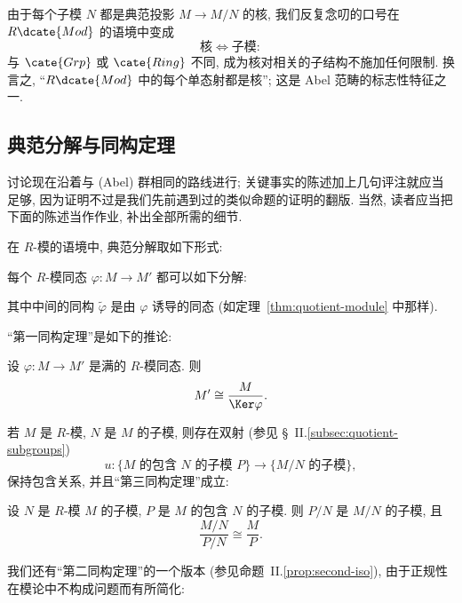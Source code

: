 由于每个子模 $N$ 都是典范投影 $M \rightarrow M/N$ 的核, 我们反复念叨的口号在 $R\dcate{Mod}$ 的语境中变成
\[
\text{核} \iff \text{子模}:
\]
与 $\cate{Grp}$ 或 $\cate{Ring}$ 不同, 成为核对相关的子结构不施加任何限制. 换言之, ``$R\dcate{Mod}$ 中的每个单态射都是核''; 这是 Abel 范畴的标志性特征之一.

\subsection{典范分解与同构定理}
\label{subsec:module-canonical}

讨论现在沿着与 (Abel) 群相同的路线进行; 关键事实的陈述加上几句评注就应当足够, 因为证明不过是我们先前遇到过的类似命题的证明的翻版. 当然, 读者应当把下面的陈述当作作业, 补出全部所需的细节.

在 $R$-模的语境中, 典范分解取如下形式:

\begin{theorem}
\label{thm:module-canonical}
每个 $R$-模同态 $\varphi : M \to M'$ 都可以如下分解:
\begin{center}
\end{center}
其中中间的同构 $\tilde{\varphi}$ 是由 $\varphi$ 诱导的同态 (如定理~\ref{thm:quotient-module} 中那样).
\end{theorem}

``第一同构定理''是如下的推论:

\begin{corollary}
\label{cor:module-first-iso}
设 $\varphi : M \to M'$ 是满的 $R$-模同态. 则
\[
M' \cong \frac{M}{\Ker \varphi}.
\]
\end{corollary}

若 $M$ 是 $R$-模, $N$ 是 $M$ 的子模, 则存在双射 (参见 \S~II.\ref{subsec:quotient-subgroups})
\[
u : \{\text{$M$ 的包含 } N \text{ 的子模 } P\} \to \{\text{$M/N$ 的子模}\},
\]
保持包含关系, 并且``第三同构定理''成立:

\begin{proposition}
\label{prop:module-third-iso}
设 $N$ 是 $R$-模 $M$ 的子模, $P$ 是 $M$ 的包含 $N$ 的子模. 则 $P/N$ 是 $M/N$ 的子模, 且
\[
\frac{M/N}{P/N} \cong \frac{M}{P}.
\]
\end{proposition}

我们还有``第二同构定理''的一个版本 (参见命题~II.\ref{prop:second-iso}), 由于正规性在模论中不构成问题而有所简化:

